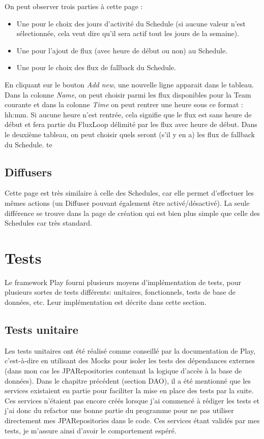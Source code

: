 \documentclass[french]{article}
\begin{document}
On peut observer trois parties à cette page :
\begin{itemize}
	\item Une pour le choix des jours d'activité du Schedule (si aucune valeur n'est sélectionnée, cela veut dire qu'il sera actif tout les jours de la semaine).
	\item Une pour l'ajout de flux (avec heure de début ou non) au Schedule.
	\item Une pour le choix des flux de fallback du Schedule.
\end{itemize}
En cliquant sur le bouton \textit{Add new}, une nouvelle ligne apparait dans le tableau. Dans la colonne \textit{Name}, on peut choisir parmi les flux disponibles pour la Team courante et dans la colonne \textit{Time} on peut rentrer une heure sous ce format : hh:mm. Si aucune heure n'est rentrée, cela signifie que le flux est sans heure de début et fera partie du FluxLoop délimité par les flux avec heure de début. \newline
Dans le deuxième tableau, on peut choisir quels seront (s'il y en a) les flux de fallback du Schedule. te
\subsection{Diffusers}

Cette page est très similaire à celle des Schedules, car elle permet d'effectuer les mêmes actions (un Diffuser pouvant également être activé/désactivé). La seule différence se trouve dans la page de création qui est bien plus simple que celle des Schedules car très standard.

\newpage
\section{Tests}

Le framework Play fourni plusieurs moyens d'implémentation de tests, pour plusieurs sortes de tests différents: unitaires, fonctionnels, tests de base de données, etc. Leur implémentation est décrite dans cette section.

\subsection{Tests unitaire}

Les tests unitaires ont été réalisé comme conseillé par la documentation de Play, c'est-à-dire en utilisant des Mocks pour isoler les tests des dépendances externes (dans mon cas les JPARepositories contenant la logique d'accès à la base de données). Dans le chapitre précédent (section DAO), il a été mentionné que les services existaient en partie pour faciliter la mise en place des tests par la suite. Ces services n'étaient pas encore créés lorsque j'ai commencé à rédiger les tests et j'ai donc du refactor une bonne partie du programme pour ne pas utiliser directement mes JPARepositories dans le code. Ces services étant validés par mes tests, je m'assure ainsi d'avoir le comportement espéré.
\end{document}
